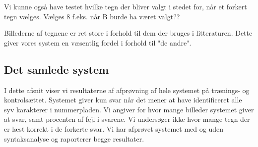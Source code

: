 Vi kunne også have testet hvilke tegn der bliver valgt i stedet for, når et forkert tegn vælges. Vælges 8 f.eks. når B burde ha været valgt??

Billederne af tegnene er ret store i forhold til dem der bruges i litteraturen. Dette giver vores system en væsentlig fordel i forhold til "de andre".




 %







\subsection{Det samlede system}
\label{sec:test:samlet_system}
I dette afsnit viser vi resultaterne af afprøvning af hele systemet på trænings- og kontrolsættet. Systemet giver kun svar når det mener at have identificeret alle syv karakterer i nummerpladen. Vi angiver for hvor mange billeder systemet giver at svar, samt procenten af fejl i svarene. Vi undersøger ikke hvor mange tegn der er læst korrekt i de forkerte svar. Vi har afprøvet systemet med og uden syntaksanalyse og raporterer begge resultater.

